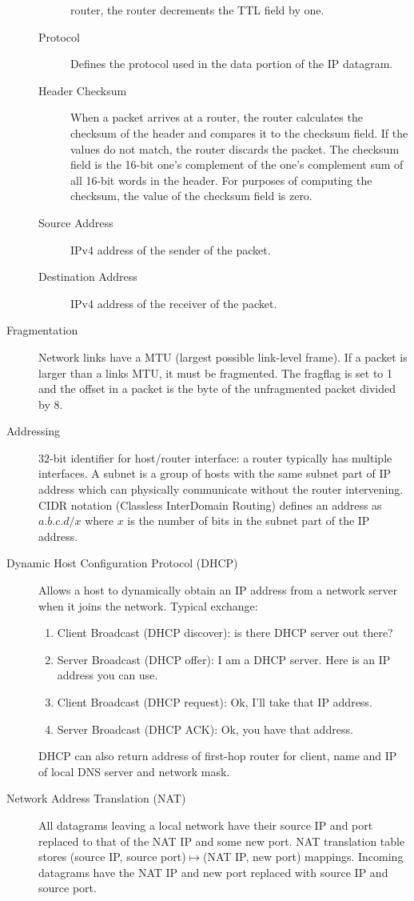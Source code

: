 \documentclass{article}
\begin{document}
\begin{description}
\begin{description}
        router, the router decrements the TTL field by one.
        \item[Protocol] Defines the protocol used in the data portion of the IP datagram.
        \item[Header Checksum]  When a packet arrives at a router, the router calculates the checksum of
        the header and compares it to the checksum field. If the values do not match, the router
        discards the packet. The checksum field is the 16-bit one's complement of the one's complement
        sum of all 16-bit words in the header. For purposes of computing the checksum, the value of the
        checksum field is zero.
        \item[Source Address] IPv4 address of the sender of the packet.
        \item[Destination Address] IPv4 address of the receiver of the packet.
    \end{description}
    
    \item[Fragmentation] Network links have a MTU (largest possible link-level frame). If a packet is
    larger than a links MTU, it must be fragmented. The fragflag is set to 1 and the offset in a 
    packet is the byte of the unfragmented packet divided by $8$.
    
    \item[Addressing] $32$-bit identifier for host/router interface: a router typically has multiple
    interfaces. A subnet is a group of hosts with the same subnet part of IP address which can 
    physically communicate without the router intervening. CIDR notation (Classless InterDomain 
    Routing) defines an address as $a.b.c.d/x$ where $x$ is the number of bits in the subnet part of the
    IP address.
    
    \item[Dynamic Host Configuration Protocol (DHCP)] Allows a host to dynamically obtain an IP address
    from a network server when it joins the network. Typical exchange:
    \begin{enumerate}
        \item Client Broadcast (DHCP discover): is there DHCP server out there?
        \item Server Broadcast (DHCP offer): I am a DHCP server. Here is an IP address you can use.
        \item Client Broadcast (DHCP request): Ok, I'll take that IP address.
        \item Server Broadcast (DHCP ACK): Ok, you have that address.
    \end{enumerate}
    DHCP can also return address of first-hop router for client, name and IP of local DNS server
    and network mask.
    
    \item[Network Address Translation (NAT)] All datagrams leaving a local network have their source
    IP and port replaced to that of the NAT IP and some new port. NAT translation table stores
    (source IP, source port)$\mapsto$(NAT IP, new port) mappings. Incoming datagrams have the NAT IP
    and new port replaced with source IP and source port.
\end{description}
\end{document}
